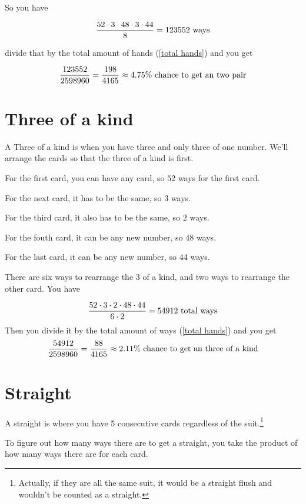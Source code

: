 \documentclass[12pt]{article}
\begin{document}
So you have

\begin{equation}
{52 \cdot 3 \cdot 48 \cdot 3 \cdot 44 \over 8} = 123552 \hbox{ ways}
\end{equation}

divide that by the total amount of hands (\ref{total hands}) and you get

\begin{equation}
{123552 \over 2598960} = {198 \over 4165} \approx 4.75\% \hbox{ chance to get an two pair}
\end{equation}

\section{Three of a kind}

A Three of a kind is when you have three and only three of one number.
We'll arrange the cards so that the three of a kind is first.

For the first card, you can have any card, so $52$ ways for the first card.

For the next card, it has to be the same, so $3$ ways.

For the third card, it also has to be the same, so $2$ ways.

For the fouth card, it can be any new number, so $48$ ways.

For the last card, it can be any new number, so $44$ ways.

There are six ways to rearrange the 3 of a kind, and two ways to rearrange the other card.
You have

\begin{equation}
  {52 \cdot 3 \cdot 2 \cdot 48 \cdot 44 \over 6  \cdot 2} = 54912 \hbox{ total ways}
\end{equation}
Then you divide it by the total amount of ways (\ref{total hands}) and you get
\begin{equation}
  {54912 \over 2598960} = {88\over4165} \approx 2.11\% \hbox{ chance to get an three of a kind}
\end{equation}
\section{Straight}
A straight is where you have 5 consecutive cards regardless of the
suit.\footnote{Actually, if they are all the same suit, it would be a
straight flush and wouldn't be counted as a straight.}

To figure out how many ways there are to get a straight, you take the product of how many ways there are for each card.
\end{document}
